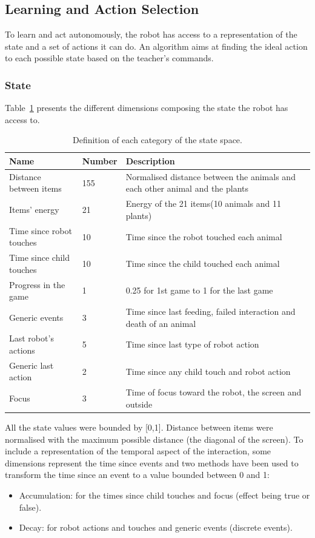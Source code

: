 \subsection{Learning and Action Selection}

To learn and act autonomously, the robot has access to a representation of the state and a set of actions it can do. An algorithm aims at finding the ideal action to each possible state based on the teacher's commands.

\subsubsection{State}

Table~\ref{tab:tuto_state_space} presents the different dimensions composing the state the robot has access to.

\begin{table}[ht]
	\centering
	\caption{Definition of each category of the state space.}
	\label{tab:tuto_state_space}
	\begin{tabularx}{\textwidth}{@{}llX@{}}\toprule
		Name & Number & Description \\
		\midrule
		Distance between items & 155 & Normalised distance between the animals and each other animal and the plants\\
		Items' energy & 21 & Energy of the 21 items(10 animals and 11 plants)\\
		Time since robot touches & 10 & Time since the robot touched each animal\\ %
		Time since child touches & 10 & Time since the child touched each animal\\ %
		Progress in the game & 1 & 0.25 for 1st game to 1 for the last game\\ 
		Generic events & 3 & Time since last feeding, failed interaction and death of an animal\\ %
		Last robot's actions & 5 & Time since last type of robot action\\ %
		Generic last action & 2 & Time since any child touch and robot action\\ %
		Focus & 3 & Time of focus toward the robot, the screen and outside\\ %
		\bottomrule
	\end{tabularx}
\end{table}

All the state values were bounded by [0,1]. Distance between items were normalised with the maximum possible distance (the diagonal of the screen). To include a representation of the temporal aspect of the interaction, some dimensions represent the time since events and two methods have been used to transform the time since an event to a value bounded between 0 and 1:
\begin{itemize}
	\item Accumulation: for the times since child touches and focus (effect being true or false).
	\item Decay: for robot actions and touches and generic events (discrete events).
\end{itemize}

